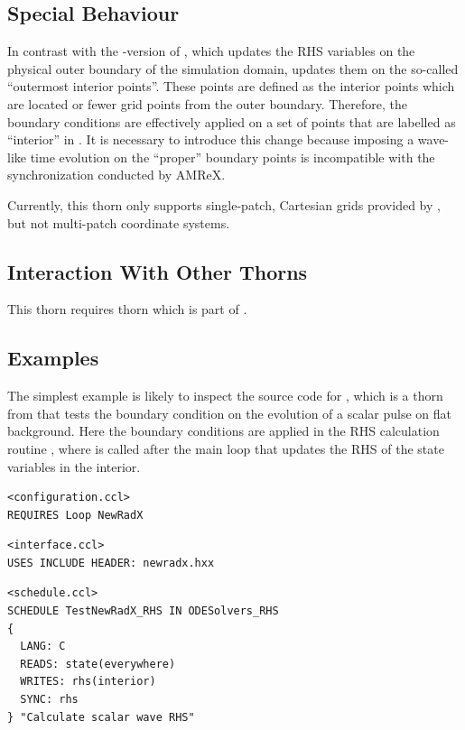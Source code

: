 \subsection{Special Behaviour}
In contrast with the -version of , which updates
the RHS variables on the physical outer boundary of the simulation domain,
 updates them on the so-called ``outermost interior points''.
These points are defined as the interior points which are located
 or fewer grid points from the outer boundary.
Therefore, the boundary conditions are effectively applied on a set of points
that are labelled as ``interior'' in .
It is necessary to introduce this change because imposing a wave-like time
evolution on the  ``proper'' boundary points is incompatible with the
synchronization conducted by AMReX.


Currently, this thorn only supports single-patch, Cartesian grids provided by
, but not multi-patch coordinate systems.


\subsection{Interaction With Other Thorns}
This thorn requires thorn  which is part of
.

\subsection{Examples}
The simplest example is likely to inspect the source code for
, which is a thorn from  that tests the
boundary condition on the evolution of a scalar pulse on flat background.
Here the boundary conditions are applied in the RHS calculation routine
, where  is called after the main
loop that updates the RHS of the state variables in the interior.

\begin{verbatim}
<configuration.ccl>
REQUIRES Loop NewRadX
\end{verbatim}

\begin{verbatim}
<interface.ccl>
USES INCLUDE HEADER: newradx.hxx
\end{verbatim}

\begin{verbatim}
<schedule.ccl>
SCHEDULE TestNewRadX_RHS IN ODESolvers_RHS
{
  LANG: C
  READS: state(everywhere)
  WRITES: rhs(interior)
  SYNC: rhs
} "Calculate scalar wave RHS"
\end{verbatim}

